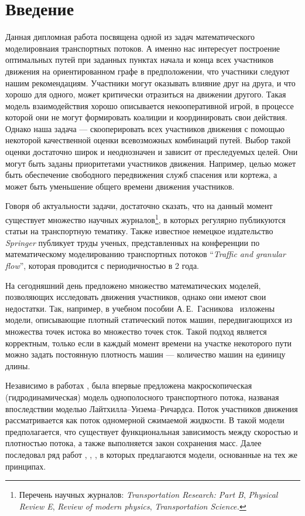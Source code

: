 \documentclass[12pt, a4paper]{article}
\begin{document}
\newpage
\pagestyle{plain}
\tableofcontents{}
\newpage	

\section*{Введение}
Данная дипломная работа посвящена одной из задач математического моделировнаия транспортных потоков. А именно нас интересует построение оптимальных путей при заданных пунктах начала и конца всех участников движения на ориентированном графе в предположении, что участники следуют нашим рекомендациям. Участники могут оказывать влияние друг на друга, и что хорошо для одного, может критически отразиться на движении другого. Такая модель взаимодействия хорошо описывается некооперативной игрой, в процессе которой они не могут формировать коалиции и координировать свои действия. Однако наша задача --- скооперировать всех участников движения с помощью некоторой качественной оценки всевозможных комбинаций путей. Выбор такой оценки достаточно широк и неоднозначен и зависит от преследуемых целей. Они могут быть заданы приоритетами участников движения. Например, целью может быть обеспечение свободного передвижения служб спасения или кортежа, а может быть уменьшение общего времени движения участников.

Говоря об актуальности задачи, достаточно сказать, что на данный момент существует множество научных журналов\footnote{Перечень научных журналов: \textit{Transportation Research: Part B},
	\textit{Physical Review E}, \textit{Review of modern physics}, \textit{Transportation Science.}}, в которых регулярно публикуются статьи на транспортную тематику. Также известное немецкое издательство \textit{Springer} публикует труды ученых, представленных на конференции по математическому моделированию транспортных потоков ``\textit{Traffic and granular flow}'', которая проводится с периодичностью в 2 года.

На сегодняшний день предложено множество математических моделей, позволяющих исследовать движения участников, однако они имеют свои недостатки. Так, например, в учебном пособии А.\,Е.~Гасникова~\cite{book} изложены модели, описывающие плотный статический поток машин, передвигающихся из множества точек истока во множество точек сток. Такой подход является корректным, только если в каждый момент времени на участке некоторого пути можно задать постоянную плотность машин --- количество машин на единицу длины. 

Независимо в работах \cite{first_macro_1}, \cite{first_macro_2} была впервые предложена макроскопическая (гидродинамическая) модель однополосного транспортного потока, названая впоследствии моделью Лайтхилла–Уизема–Ричардса. Поток участников движения рассматривается как поток одномерной сжимаемой жидкости. В такой модели предполагается, что существует функциональная зависимость между скоростью и плотностью потока, а также выполняется закон сохранения масс. Далее последовал ряд работ \cite{macro_tanoc}, \cite{macro_uizem}, \cite{macro_payne}, в которых предлагаются модели, основанные на тех же принципах.
\end{document}

